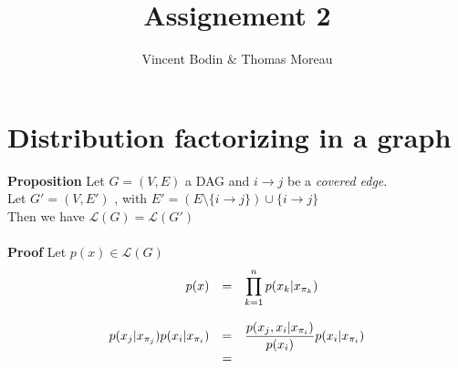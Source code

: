 \documentclass[11pt]{article}
\title{\textbf{Assignement 2}}
\author{Vincent Bodin \& Thomas Moreau}
\date{}
\begin{document}
\maketitle

\section{Distribution factorizing in a graph}

\textbf{Proposition} Let $G = (V, E)$ a DAG and $i \rightarrow j$ be a \textit{covered edge}.\\
Let  $G' = (V, E')$ , with $E' = (E\setminus\{i\rightarrow j\})\cup \{i \rightarrow j\}$\\
Then we have $\mathcal{L}(G) = \mathcal{L}(G')$\\
\\
\textbf{Proof}  Let $p(x) \in \mathcal{L}(G)$\\
\begin{equation*}
\begin{array}{r l l}
p(x) &=& \displaystyle\prod_{k=1}^{n} p(x_k | x_{\pi_k})\\
\\
p(x_j | x_{\pi_j}) p(x_i | x_{\pi_i}) &=& \displaystyle \frac{p(x_j, x_i | x_{\pi_i})}{p(x_i)} p(x_i|x_{\pi_i}) \\
&=& \\
\end{array}
\end{equation*}
\end{document}
